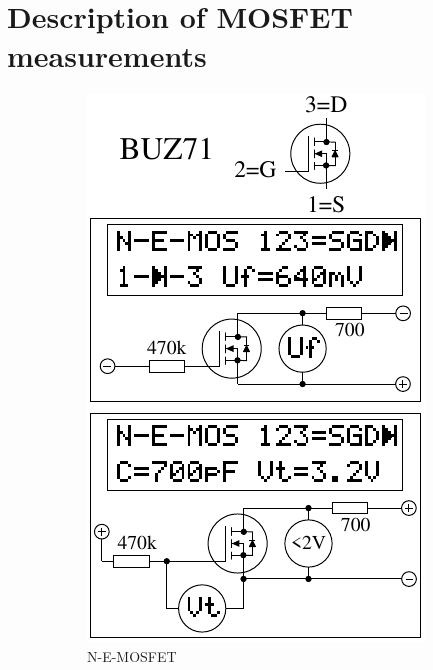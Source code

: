 \chapter{Description of  MOSFET measurements}
\label{sec:MOSmeasurements}

\begin{figure}[H]
  \begin{subfigure}[b]{.5\textwidth}
    \centering
    \includegraphics[width=1.\textwidth]{../FIG/MOS_BUZ71.pdf}
    \caption{N-E-MOSFET}
    \label{fig:MOS-N-E}
  \end{subfigure}
  ~
  \begin{subfigure}[b]{.5\textwidth}

\end{subfigure}
\end{figure}

